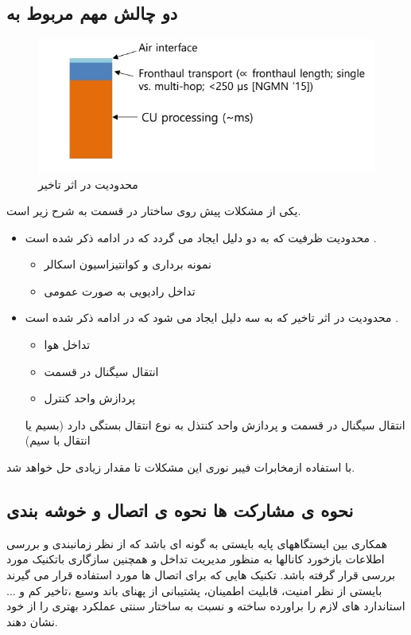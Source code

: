 \subsection{دو چالش مهم مربوط به }
 \begin{figure}
  \centering
    \includegraphics[scale=0.7]{c6}
  \caption{محدودیت در اثر تاخیر \cite{simeoneConf}  }
  \label{fig:c6}
\end{figure}
یکی از مشکلات پیش روی ساختار  در قسمت  به شرح زیر است.
\begin{itemize}
\item
 محدودیت ظرفیت که
 به دو دلیل ایجاد می گردد که در ادامه ذکر شده است \cite{simeoneConf}.
 \begin{itemize}
 \item
 نمونه برداری و کوانتیزاسیون اسکالر
 \item
 تداخل رادیویی به صورت عمومی
 \end{itemize}
  
 \item 
  محدودیت در اثر تاخیر که
   به سه دلیل ایجاد می شود که در ادامه ذکر شده است \cite{simeoneConf}.
  \begin{itemize}
 \item
 تداخل هوا
 \item
 انتقال سیگنال در قسمت 
 \item
 پردازش واحد کنترل
 \end{itemize}
   انتقال سیگنال در قسمت  و پردازش واحد کنتذل به نوع انتقال  بستگی دارد (بسیم یا انتقال با سیم) 
\end{itemize}
با استفاده ازمخابرات فیبر نوری این مشکلات تا مقدار زیادی حل خواهد شد. 
\subsection{نحوه ی مشارکت  ها نحوه ی اتصال
و خوشه بندی}

همکاری بین ایستگاههای پایه بایستی به گونه ای باشد
که از نظر زمانبندی و بررسی اطلاعات بازخورد کانالها
به منظور مدیریت تداخل و همچنین سازگاری باتکنیک
   مورد بررسی قرار گرفته باشد.
تکنیک هایی که برای اتصال ها مورد استفاده قرار
می گیرند بایستی از نظر امنیت، قابلیت اطمینان، پشتیبانی
از پهنای باند وسیع ،تاخیر کم و ... استاندارد های لازم را
براورده ساخته و نسبت به ساختار سنتی عملکرد بهتری را
از خود نشان دهند.
